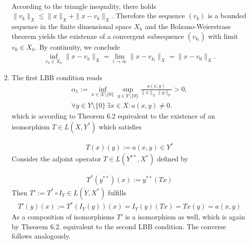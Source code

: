 \begin{solution}
\begin{enumerate}[label = \textbf{\alph*)}]
\begin{align*}
  \end{align*}
  According to the triangle inequality, there holds $\|v_k\|_X \leq \|x\|_X + \|x - v_k\|_X$.
  Therefore the sequence $(v_k)$ is a bounded sequence in the finite dimensional space $X_h$
  and the Bolzano-Weierstrass theorem yields the existenxe of a convergent subsequence $(v_{k_l})$
  with limit $v_0 \in X_h$. By continuity, we conclude
  \begin{align*}
    \inf_{v_h \in X_h} \|x - v_h\|_X = \lim_{l \to \infty} \|x - v_{k_l}\|_X = \|x - v_0\|_X.
  \end{align*}
  \item The first LBB condition reads
  \begin{align*}
    \alpha_1 := \inf_{x \in X\setminus \{0\}} \sup_{y \in Y \setminus \{0\}}
    \frac{a(x,y)}{\|x\|_X\|y\|_Y} > 0, \\
    \forall y \in Y \setminus \{0\}\, \exists x \in X: a(x,y) \neq 0.
  \end{align*}
  which is according to Theorem 6.2 equivalent to the existence of an isomorphism
  $T \in L(X,Y^*)$ which satisfies

  \begin{align*}
    T(x)(y) := a(x,y) \in Y^*
  \end{align*}
  Consider the adjoint operator $T \in L(Y^{**}, X^*)$ defined by

  \begin{align*}
    T^*(y^{**})(x) := y^{**}(Tx)
  \end{align*}
  Then $T' := T^* \circ I_Y \in L(Y,X^*)$ fulfills
  \begin{align*}
    T'(y)(x) := T^*(I_Y(y))(x) = I_Y(y)(Tx) = Tx(y) = a(x,y)
  \end{align*}
  As a composition of isomorphisms $T'$ is a isomorphism as well, which is again by Theorem 6.2.
  equivalent to the second LBB condition.
  The converse follows analogously.

\end{enumerate}

\end{solution}

